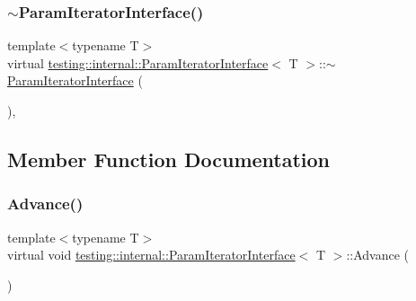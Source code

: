 \subsubsection{\texorpdfstring{$\sim$ParamIteratorInterface()}{~ParamIteratorInterface()}\hspace{0.1cm}{\footnotesize\ttfamily [3/3]}}
{\footnotesize\ttfamily template$<$typename T$>$ \\
virtual \mbox{\hyperlink{classtesting_1_1internal_1_1_param_iterator_interface}{testing\+::internal\+::\+Param\+Iterator\+Interface}}$<$ T $>$\+::$\sim$\mbox{\hyperlink{classtesting_1_1internal_1_1_param_iterator_interface}{Param\+Iterator\+Interface}} (\begin{DoxyParamCaption}{ }\end{DoxyParamCaption})\hspace{0.3cm}{\ttfamily [inline]}, {\ttfamily [virtual]}}



\subsection{Member Function Documentation}
\mbox{\label{classtesting_1_1internal_1_1_param_iterator_interface_a600dbd35fcb551463e379516a1abea48}} 
\subsubsection{\texorpdfstring{Advance()}{Advance()}\hspace{0.1cm}{\footnotesize\ttfamily [1/3]}}
{\footnotesize\ttfamily template$<$typename T$>$ \\
virtual void \mbox{\hyperlink{classtesting_1_1internal_1_1_param_iterator_interface}{testing\+::internal\+::\+Param\+Iterator\+Interface}}$<$ T $>$\+::Advance (\begin{DoxyParamCaption}{ }\end{DoxyParamCaption})\hspace{0.3cm}{\ttfamily [pure virtual]}}



